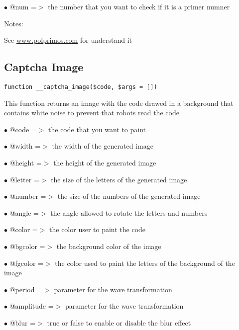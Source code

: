 \documentclass[a4paper]{book}
\def\htmladdnormallink#1#2{\href{#2}{#1}}
\begin{document}
\begin{compactitem}
\item[\color{myblue}$\bullet$] @num =$>$ the number that you want to check if it is a primer numner
\end{compactitem}

Notes:

See \htmladdnormallink{www.polprimos.com}{www.polprimos.com} for understand it

\hypertarget{toc46}{}
\subsection{Captcha Image}

\begin{lstlisting}
function __captcha_image($code, $args = [])
\end{lstlisting}

This function returns an image with the code drawed in a background that
contains white noise to prevent that robots read the code

\begin{compactitem}
\item[\color{myblue}$\bullet$] @code      =$>$ the code that you want to paint
\item[\color{myblue}$\bullet$] @width     =$>$ the width of the generated image
\item[\color{myblue}$\bullet$] @height    =$>$ the height of the generated image
\item[\color{myblue}$\bullet$] @letter    =$>$ the size of the letters of the generated image
\item[\color{myblue}$\bullet$] @number    =$>$ the size of the numbers of the generated image
\item[\color{myblue}$\bullet$] @angle     =$>$ the angle allowed to rotate the letters and numbers
\item[\color{myblue}$\bullet$] @color     =$>$ the color user to paint the code
\item[\color{myblue}$\bullet$] @bgcolor   =$>$ the background color of the image
\item[\color{myblue}$\bullet$] @fgcolor   =$>$ the color used to paint the letters of the background of the image
\item[\color{myblue}$\bullet$] @period    =$>$ parameter for the wave transformation
\item[\color{myblue}$\bullet$] @amplitude =$>$ parameter for the wave transformation
\item[\color{myblue}$\bullet$] @blur      =$>$ true or false to enable or disable the blur effect
\end{compactitem}
\end{document}
